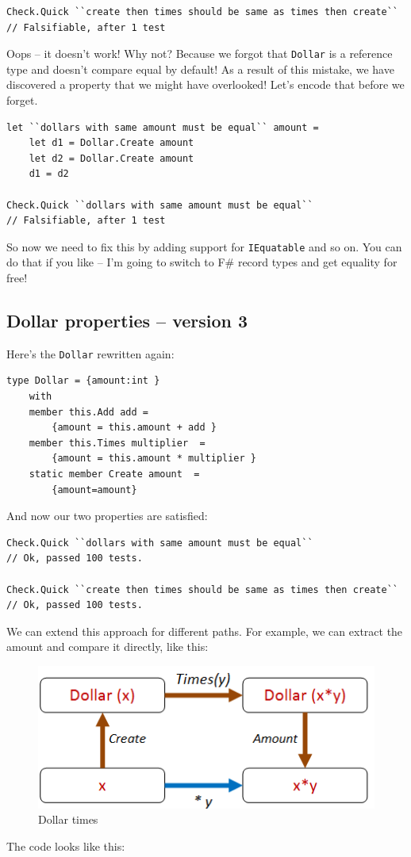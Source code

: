 \begin{verbatim}
Check.Quick ``create then times should be same as times then create``
// Falsifiable, after 1 test
\end{verbatim}
Oops -- it doesn't work!
Why not? Because we forgot that \texttt{Dollar} is a reference type and
doesn't compare equal by default!
As a result of this mistake, we have discovered a property that we might
have overlooked! Let's encode that before we forget.

\begin{verbatim}
let ``dollars with same amount must be equal`` amount = 
	let d1 = Dollar.Create amount 
	let d2 = Dollar.Create amount 
	d1 = d2

Check.Quick ``dollars with same amount must be equal`` 
// Falsifiable, after 1 test
\end{verbatim}
So now we need to fix this by adding support for \texttt{IEquatable} and
so on.
You can do that if you like -- I'm going to switch to F\# record types
and get equality for free!

\subsection{Dollar properties -- version
3}
\label{dollar-properties-version-3}

Here's the \texttt{Dollar} rewritten again:

\begin{verbatim}
type Dollar = {amount:int } 
	with 
	member this.Add add = 
		{amount = this.amount + add }
	member this.Times multiplier  = 
		{amount = this.amount * multiplier }
	static member Create amount  = 
		{amount=amount}
\end{verbatim}
And now our two properties are satisfied:

\begin{verbatim}
Check.Quick ``dollars with same amount must be equal`` 
// Ok, passed 100 tests.

Check.Quick ``create then times should be same as times then create``
// Ok, passed 100 tests.
\end{verbatim}
We can extend this approach for different paths. For example, we can
extract the amount and compare it directly, like this:
\begin{figure}[htbp]
\centering
\includegraphics{pics/property_dollar_times2.png}
\caption{Dollar times}
\end{figure}
The code looks like this:

